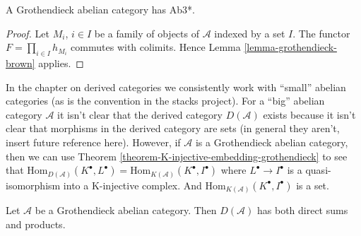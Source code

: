 \begin{lemma}
\label{lemma-grothendieck-products}
A Grothendieck abelian category has Ab3*.
\end{lemma}

\begin{proof}
Let $M_i$, $i \in I$ be a family of objects of $\mathcal{A}$ indexed
by a set $I$. The functor $F = \prod_{i \in I} h_{M_i}$
commutes with colimits. Hence
Lemma \ref{lemma-grothendieck-brown}
applies.
\end{proof}

\begin{remark}
\label{remark-existence-D}
In the chapter on derived categories we consistently work with
``small'' abelian categories (as is the convention in the stacks
project). For a ``big'' abelian category $\mathcal{A}$ it isn't clear
that the derived category $D(\mathcal{A})$ exists because it isn't
clear that morphisms in the derived category are sets (in general they
aren't, insert future reference here). However, if
$\mathcal{A}$ is a Grothendieck abelian category, then we can use
Theorem \ref{theorem-K-injective-embedding-grothendieck}
to see that
$\text{Hom}_{D(\mathcal{A})}(K^\bullet, L^\bullet) =
\text{Hom}_{K(\mathcal{A})}(K^\bullet, I^\bullet)$
where $L^\bullet \to I^\bullet$ is a quasi-isomorphism into a
K-injective complex. And $\text{Hom}_{K(\mathcal{A})}(K^\bullet, I^\bullet)$
is a set.
\end{remark}

\begin{lemma}
\label{lemma-derived-products}
Let $\mathcal{A}$ be a Grothendieck abelian category.
Then $D(\mathcal{A})$ has both direct sums and products.
\end{lemma}

